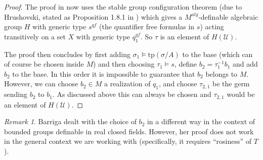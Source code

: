 \documentclass[12pt]{article}
\theoremstyle{definition}
\theoremstyle{mystyle}
\theoremstyle{remark}
\newtheorem{rem}[thm]{Remark}
\newcommand{\acl}{\mathrm{acl}}
\newcommand{\tp}{\mathrm{tp}}
\begin{document}
\begin{proof}
The proof in \cite{HrPi} now uses the stable group configuration
theorem (due to Hrushovski, stated as Proposition 1.8.1 in
\cite{HrPi}) which gives a $M^{alg}$-definable algebraic group $H$
with generic type $s^{qf}$ (the quantifier free formulas in $s$)
acting transitively on a set $X$ with generic type $q_1^{qf}$. So
$\tau$ is an element of $H(\mathcal U)$.

The proof then concludes by first adding $\sigma_1\models
\tp(\sigma/A)$ to the base (which can of course be chosen inside
$M$) and then choosing $\tau_1\models s$, define $b_2=\tau_1^{-1}
b_1$ and add $b_2$ to the base. In this order it is impossible to
guarantee that $b_2$ belongs to $M$. However, we can choose
$b_2\in M$ a realization of $q_1$, and choose $\tau_{2,1}$ be the
germ sending $b_2$ to $b_1$. As discussed above this can always be
chosen and $\tau_{2,1}$ would be an element of $H(\mathcal U)$.
\end{proof}

\begin{rem}
Barriga \cite{Ba} dealt with the choice of $b_2$ in a different
way in the context of bounded groups definable in real closed
fields. However, her proof does not work in the general
context we are working with (specifically, it requires
``rosiness'' of $T$).
\end{rem}


\begin{comment}
We go through the proof to see that this can be arranged. The
elements $a,b,c$ in the proof were picked at the beginning and
never changed in the proof, so we only need to verify that all the
base extensions done during the construction can take place inside
$M$. But this holds since whenever a new point is introduced, it
is chosen independently (in the sense of dimension) from all the
points chosen so far, and we can always do that inside $M$. More
precisely, following the notations of the proof: in Lemma 3.2, we
first chose $x'$ in $G(M)$, then pick $z_1 \in G(M)$ and this
ensures that $A_2 \subseteq M$. The set $A$ after the proof of 3.2
is equal to $\acl(A_2)\cap F$ and is therefore in $M$. There are
only two base extensions left, done at the very end. We chose
$\sigma_1 \in M$ and have $A_1 = \acl(A,\sigma_1)\cap F\subseteq
M$ (it seems that there is a typo in the paper, it says $A_1 =
\acl(A,\sigma)\cap F$ instead). Finally, take $\tau_1$ such that
$b_2 := \tau_1^{-1} \cdot b_1$ is in $M$. This can be ensured for
example by choosing $b_2$ first. Then $A_2 \subseteq M$ and we are
done.
\end{comment}
\end{document}

